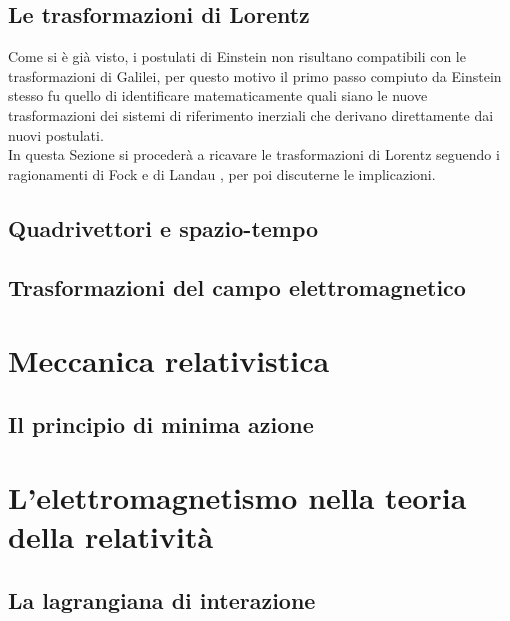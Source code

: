 \documentclass[12pt,a4paper]{book}
\numberwithin{equation}{section}
\begin{document}
\begin{sloppypar}
\section{Le trasformazioni di Lorentz}
Come si è già visto, i postulati di Einstein non risultano compatibili con le trasformazioni di Galilei, 
per questo motivo il primo passo compiuto da Einstein stesso fu quello di identificare matematicamente quali siano 
le nuove trasformazioni dei sistemi di riferimento inerziali che derivano direttamente dai nuovi postulati.\\
In questa Sezione si procederà a ricavare le trasformazioni di Lorentz seguendo i ragionamenti di Fock \cite{Fock} e di Landau \cite{Landau}, 
per poi discuterne le implicazioni.  




\section{Quadrivettori e spazio-tempo}
\label{sec:4-vettori}


\section{Trasformazioni del campo elettromagnetico}


\chapter{Meccanica relativistica}
\section{Il principio di minima azione}


%


\chapter{L'elettromagnetismo nella teoria della relatività}
\section{La lagrangiana di interazione}


\end{sloppypar}
\end{document}
